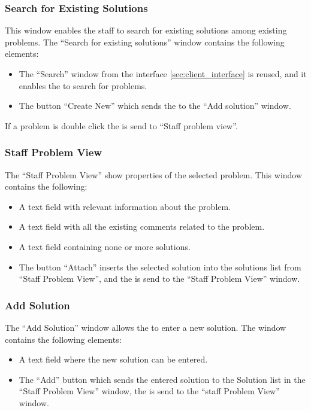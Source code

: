 \subsubsection{Search for Existing Solutions}
This window enables the staff to search for existing solutions among existing problems. The ``Search for existing solutions'' window contains the following elements:
\begin{itemize}
	\item The ``Search'' window from the \aclient[] interface \ref{sec:client_interface} is reused, and it enables the \astaff[] to search for problems.
	\item The button ``Create New'' which sends the \astaff[] to the ``Add solution'' window.
\end{itemize} 
If a problem is double click the \astaff[] is send to ``Staff problem view''.

\subsubsection{Staff Problem View}
The ``Staff Problem View'' show properties of the selected problem. This window contains the following:
\begin{itemize}
	\item A text field with relevant information about the problem.
	\item A text field with all the existing comments related to the problem.
	\item A text field containing none or more solutions.
	\item The button ``Attach'' inserts the selected solution into the solutions list from ``Staff Problem View'', and the \astaff[] is send to the ``Staff Problem View'' window.
\end{itemize}

\subsubsection{Add Solution}
The ``Add Solution'' window allows the \staff[] to enter a new solution. The window contains the following elements:
\begin{itemize}
	\item A text field where the new solution can be entered.
	\item The ``Add'' button which sends the entered solution to the Solution list in the ``Staff Problem View'' window, the \astaff[] is send to the ``staff Problem View'' window.
\end{itemize}
 


